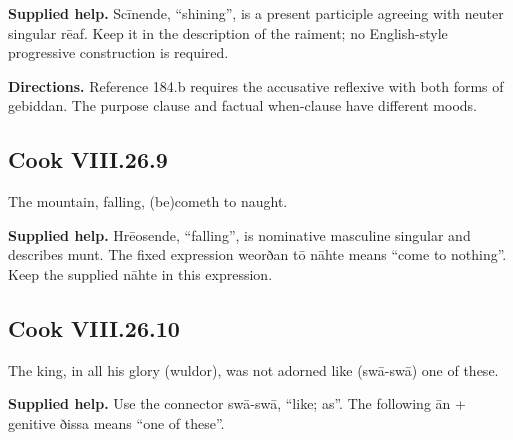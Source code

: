 \textbf{Supplied help.} Scīnende, “shining”, is a present participle agreeing with neuter singular rēaf. Keep it in the description of the raiment; no English-style progressive construction is required.

\textbf{Directions.} Reference 184.b requires the accusative reflexive with both forms of gebiddan. The purpose clause and factual when-clause have different moods.

\par\begin{minipage}{\linewidth}\raggedright
\subsection*{Cook VIII.26.9}

The mountain, falling, (be)cometh to naught.

\end{minipage}\par\addvspace{4pt}

\textbf{Supplied help.} Hrēosende, “falling”, is nominative masculine singular and describes munt. The fixed expression weorðan tō nāhte means “come to nothing”. Keep the supplied nāhte in this expression.

\par\begin{minipage}{\linewidth}\raggedright
\subsection*{Cook VIII.26.10}

The king, in all his glory (wuldor), was not adorned like (swā-swā) one of these.

\end{minipage}\par\addvspace{4pt}

\textbf{Supplied help.} Use the connector swā-swā, “like; as”. The following ān + genitive ðissa means “one of these”.

